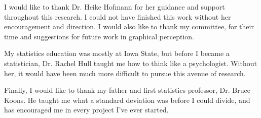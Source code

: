
I would like to thank Dr. Heike Hofmann for her guidance and support throughout this research. I could not have finished this work without her encouragement and direction. 
I would also like to thank my committee, for their time and suggestions for future work in graphical perception. 

My statistics education was mostly at Iowa State, but before I became a statistician, Dr. Rachel Hull taught me how to think like a psychologist. Without her, it would have been much more difficult to pursue this avenue of research.

Finally, I would like to thank my father and first statistics professor, Dr. Bruce Koons. He taught me what a standard deviation was before I could divide, and has encouraged me in every project I've ever started. 